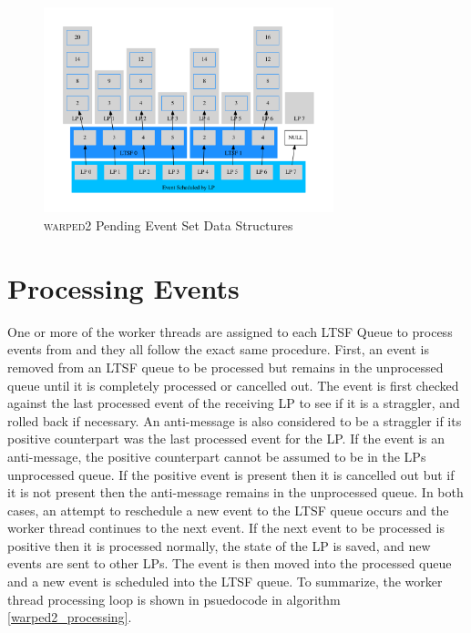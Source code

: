 \documentclass[11pt]{book}
\begin{document}
\begin{figure}
    \centering
    \includegraphics[width=0.75\textwidth,quiet]{figs/graphviz/pending_event_set.pdf}
    \caption{\textsc{warped2} Pending Event Set Data Structures}\label{pending_event_set}
\end{figure}

\section{Processing Events}

One or more of the worker threads are assigned to each LTSF Queue to process events from
and they all follow the exact same procedure. First, an event is removed from an LTSF
queue to be processed but remains in the unprocessed queue until it is completely processed or
cancelled out. The event is first checked against the last processed event of the receiving LP
to see if it is a straggler, and rolled back if necessary. An anti-message is also considered to
be a straggler if its positive counterpart was the last processed event for the LP.
If the event is an anti-message, the positive counterpart cannot be assumed to be in the LPs
unprocessed queue. If the positive event is present then it is cancelled out but if it is not
present then the anti-message remains in the unprocessed queue. In both cases, an attempt to
reschedule a new event to the LTSF queue occurs and the worker thread continues to the next
event. If the next event to be processed is positive then it is processed normally, the state
of the LP is saved, and new events are sent to other LPs. The event is then moved into the
processed queue and a new event is scheduled into the LTSF queue. To summarize, the worker
thread processing loop is shown in psuedocode in algorithm \ref{warped2_processing}.
\end{document}
